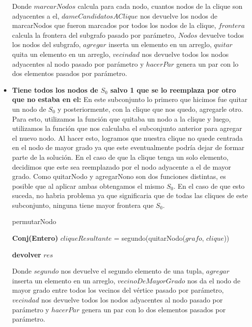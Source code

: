 \begin{itemize}
Donde $marcarNodos$ calcula para cada nodo, cuantos nodos de la clique son adyacentes a el, $dameCandidatosAClique$ nos devuelve los nodos de marcarNodos que fueron marcados por todos los nodos de la clique, $frontera$ calcula la frontera del subgrafo pasado por parámetro, $Nodos$ devuelve todos los nodos del subgrafo, $agregar$ inserta un elemento en un arreglo, $quitar$ quita un elemento en un arreglo, $vecindad$ nos devuelve todos los nodos adyacentes al nodo pasado por parámetro y $hacerPar$ genera un par con lo dos elementos pasados por parámetro. \newline

\item \textbf{Tiene todos los nodos de $S_{0}$ salvo 1 que se lo reemplaza por otro que no estaba en el:} \newline
En este subconjunto lo primero que hicimos fue quitar un nodo de $S_{0}$ y posteriormente, con la clique que nos quedo, agregarle otro. Para esto, utilizamos la función que quitaba un nodo a la clique y luego, utilizamos la función que nos calculaba el subconjunto anterior para agregar el nuevo nodo. Al hacer esto, logramos que nuestra clique no quede centrada en el nodo de mayor grado ya que este eventualmente podría dejar de formar parte de la solución.
En el caso de que la clique tenga un solo elemento, decidimos que este sea reemplazado por el nodo adyacente a el de mayor grado.  \newline
Como quitarNodo y agregarNono son dos funciones distintas, es posible que al aplicar ambas obtengamos el mismo $S_{0}$. En el caso de que esto suceda, no habria problema ya que significaria que de todas las cliques de este subconjunto, ninguna tiene mayor frontera que $S_{0}$.
\begin{algorithm}[H]
    \SetAlgoLined
    \caption{permutarNodo}
	
   \textbf{Conj(Entero)} $cliqueResultante$ = segundo(quitarNodo($grafo$, $clique$)) \\


    \textbf{devolver} $res$ \\
\end{algorithm}
Donde $segundo$ nos devuelve el segundo elemento de una tupla,  $agregar$ inserta un elemento en un arreglo, $vecinoDeMayorGrado$ nos da el nodo de mayor grado entre todos los vecinos del vértice pasado por parámetro, $vecindad$ nos devuelve todos los nodos adyacentes al nodo pasado por parámetro y $hacerPar$ genera un par con lo dos elementos pasados por parámetro. \newline
\end{itemize}

